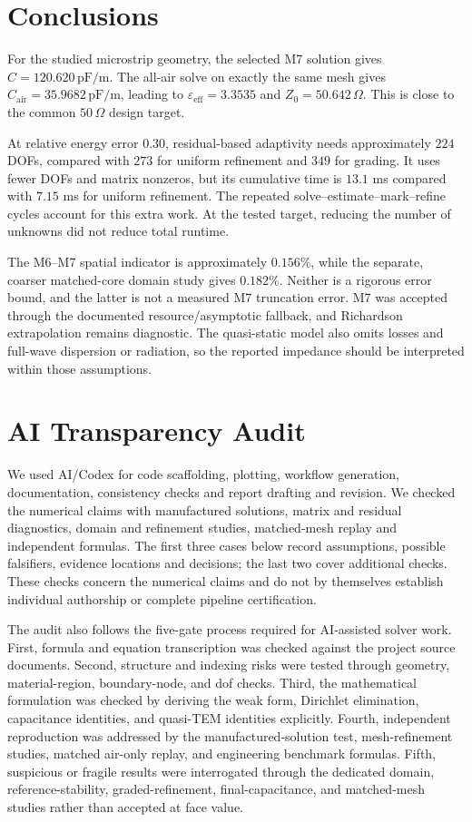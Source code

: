 \documentclass[11pt]{article}
\newcommand{\epseff}{\varepsilon_{\mathrm{eff}}}
\newcommand{\Cair}{C_{\mathrm{air}}}
\newcommand{\Zzero}{Z_0}
\begin{document}
\section{Conclusions}
For the studied microstrip geometry, the selected M7 solution gives $C=120.620\,\mathrm{pF/m}$. The all-air solve on exactly the same mesh gives $\Cair=35.9682\,\mathrm{pF/m}$, leading to $\epseff=3.3535$ and $\Zzero=50.642\,\Omega$. This is close to the common $50\,\Omega$ design target.

At relative energy error $0.30$, residual-based adaptivity needs approximately $224$ DOFs, compared with $273$ for uniform refinement and $349$ for grading. It uses fewer DOFs and matrix nonzeros, but its cumulative time is $13.1$ ms compared with $7.15$ ms for uniform refinement. The repeated solve--estimate--mark--refine cycles account for this extra work. At the tested target, reducing the number of unknowns did not reduce total runtime.

The M6--M7 spatial indicator is approximately $0.156\%$, while the separate, coarser matched-core domain study gives $0.182\%$. Neither is a rigorous error bound, and the latter is not a measured M7 truncation error. M7 was accepted through the documented resource/asymptotic fallback, and Richardson extrapolation remains diagnostic. The quasi-static model also omits losses and full-wave dispersion or radiation, so the reported impedance should be interpreted within those assumptions.





\appendix
\section{AI Transparency Audit}
We used AI/Codex for code scaffolding, plotting, workflow generation, documentation, consistency checks and report drafting and revision. We checked the numerical claims with manufactured solutions, matrix and residual diagnostics, domain and refinement studies, matched-mesh replay and independent formulas. The first three cases below record assumptions, possible falsifiers, evidence locations and decisions; the last two cover additional checks. These checks concern the numerical claims and do not by themselves establish individual authorship or complete pipeline certification.

The audit also follows the five-gate process required for AI-assisted solver work. First, formula and equation transcription was checked against the project source documents. Second, structure and indexing risks were tested through geometry, material-region, boundary-node, and dof checks. Third, the mathematical formulation was checked by deriving the weak form, Dirichlet elimination, capacitance identities, and quasi-TEM identities explicitly. Fourth, independent reproduction was addressed by the manufactured-solution test, mesh-refinement studies, matched air-only replay, and engineering benchmark formulas. Fifth, suspicious or fragile results were interrogated through the dedicated domain, reference-stability, graded-refinement, final-capacitance, and matched-mesh studies rather than accepted at face value.
\end{document}
